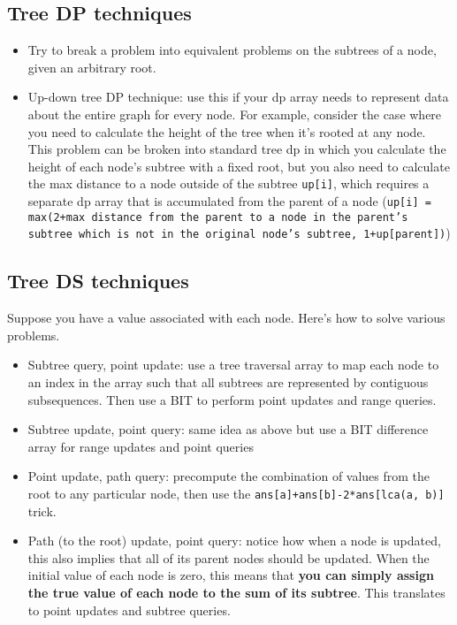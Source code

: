 \documentclass[12pt]{article}
\newcommand{\code}[1]{\texttt{#1}}
\begin{document}
\subsection{Tree DP techniques}
\begin{itemize}
    \item Try to break a problem into equivalent problems on the subtrees of a node, given an arbitrary root.
    \item Up-down tree DP technique: use this if your dp array needs to represent data about the entire graph for every node.
          For example, consider the case where you need to calculate the height of the tree when it's rooted at any node.
          This problem can be broken into standard tree dp in which you calculate the height of each node's subtree with a fixed root,
          but you also need to calculate the max distance to a node outside of the subtree \code{up[i]}, which requires a separate dp array
          that is accumulated from the parent of a node (\code{up[i] = max(2+max distance from the parent to a node in
          the parent's subtree which is not
          in the original node's subtree, 1+up[parent])})
\end{itemize}

\subsection{Tree DS techniques}
Suppose you have a value associated with each node. Here's how to solve various problems.

\begin{itemize}

    \item Subtree query, point update: use a tree traversal array to map each node to an index in the array such that
          all subtrees are represented by contiguous subsequences. Then use a BIT to perform point updates and range queries.

    \item Subtree update, point query: same idea as above but use a BIT difference array for range updates and point queries
    
    \item Point update, path query: precompute the combination of values from the root to any particular node, then use 
    the \code{ans[a]+ans[b]-2*ans[lca(a, b)]} trick.

    \item Path (to the root) update, point query: notice how when a node is updated, this also implies that all of its 
    parent nodes should be updated. When the initial value of each node is zero, this means that \textbf{you can simply 
    assign the true value of each node to the sum of its subtree}. This translates to point updates and subtree queries.

\end{itemize}
\end{document}
